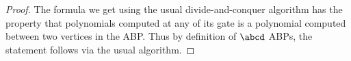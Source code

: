 \ABPtoForm*

\begin{proof}
	The formula we get using the usual divide-and-conquer algorithm has the property that polynomials computed at any of its gate is a polynomial computed between two vertices in the ABP.
	Thus by definition of $\abcd$ ABPs, the statement follows via the usual algorithm.
\end{proof}
















































































